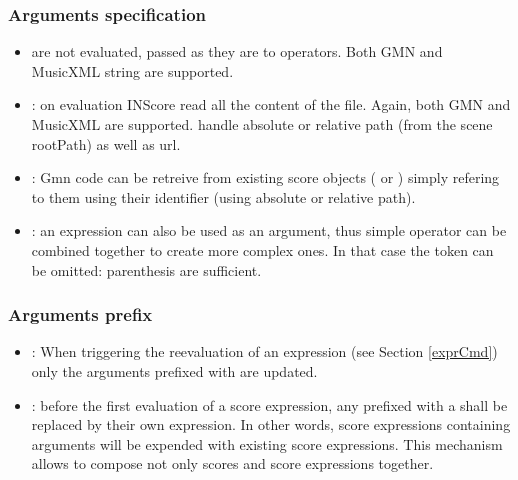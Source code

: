 \subsubsection{Arguments specification}
\label{argsSpec}

\begin{itemize}
\item {} are not evaluated, passed as they are to operators. Both GMN and MusicXML string are supported.
\item {}: on evaluation INScore read all the content of the file. Again, both GMN and MusicXML are supported.  handle absolute or relative path (from the scene rootPath) as well as url.
\item {}: Gmn code can be retreive from existing score objects ( or ) simply refering to them using their identifier (using absolute or relative path).
\item {}: an expression can also be used as an argument, thus simple operator can be combined together to create more complex ones. In that case the  token can be omitted: parenthesis are sufficient.
\end{itemize}

\subsubsection{Arguments prefix}
\label{argsPrefix}

\begin{itemize}
\item \OSC{\&}: When triggering the reevaluation of an expression (see Section \ref{exprCmd}) only the arguments prefixed with \OSC{\&} are updated.


\item \OSC{\lowTilde}: before the first evaluation of a score expression, any  prefixed with a \OSC{\lowTilde} shall be replaced by their own expression. In other words, score expressions containing \OSC{\lowTilde} arguments will be expended with existing score expressions. This mechanism allows to compose not only scores and score expressions together.

\end{itemize}

